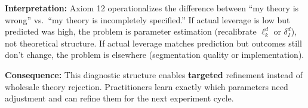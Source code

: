 \begin{tcolorbox}[colback=orange!5!white, colframe=orange!75!black,
    title=Axiom SEG-VAL-12: Diagnostic Refinement Principle]
\begin{enumerate}
\end{enumerate}

\textbf{Interpretation:}
Axiom 12 operationalizes the difference between ``my theory is wrong'' vs.\ ``my theory is incompletely specified.''
If actual leverage is low but predicted was high, the problem is parameter estimation (recalibrate $\ell_k^d$ or $\delta_I^d$),
not theoretical structure. If actual leverage matches prediction but outcomes still don't change, the problem is elsewhere
(segmentation quality or implementation).

\textbf{Consequence:}
This diagnostic structure enables \textbf{targeted} refinement instead of wholesale theory rejection. Practitioners
learn exactly which parameters need adjustment and can refine them for the next experiment cycle.

\end{tcolorbox}

\vspace{1em}

